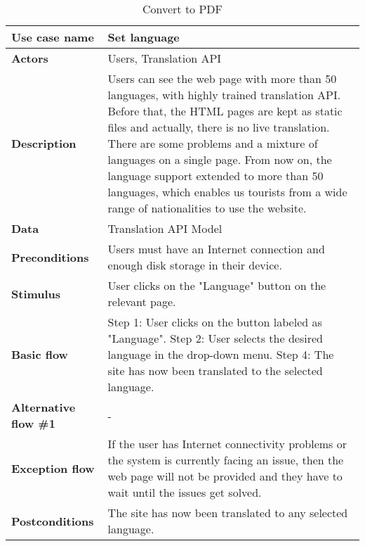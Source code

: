 \documentclass[listof=nochaptergap]{report}
\begin{document}
    \begin{table}[H]
        \centering
         \begin{tabular}{| p{4cm} | p{10cm} |} 
         \hline
         \textbf{Use case name} & Set language \\
         \hline
         \textbf{Actors} & Users, Translation API \\
         \hline
         \textbf{Description} & Users can see the web page with more than 50 languages, with highly trained translation API. Before that, the HTML pages are kept as static files and actually, there is no live translation. There are some problems and a mixture of languages on a single page. From now on, the language support extended to more than 50 languages, which enables us tourists from a wide range of nationalities to use the website. \\
         \hline
         \textbf{Data} & Translation API Model \\
         \hline
         \textbf{Preconditions} & Users must have an Internet connection and enough disk storage in their device. \\
         \hline
         \textbf{Stimulus} & User clicks on the "Language" button on the relevant page. \\
         \hline
         \textbf{Basic flow} & Step 1: User clicks on the button labeled as "Language". \newline Step 2: User selects the desired language in the drop-down menu.  \newline Step 4: The site has now been translated to the selected language. \\
         \hline
         \textbf{Alternative flow \#1} & - \\
         \hline
         \textbf{Exception flow} & If the user has Internet connectivity problems or the system is currently facing an issue, then the web page will not be provided and they have to wait until the issues get solved. \\
         \hline
         \textbf{Postconditions} & The site has now been translated to any selected language. \\
         \hline
         \end{tabular}
        \caption{Convert to PDF}
        \label{tab:table17}
    \end{table}
\end{document}
